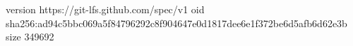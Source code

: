 version https://git-lfs.github.com/spec/v1
oid sha256:ad94c5bbc069a5f84796292c8f904647e0d1817dee6e1f372be6d5afb6d62e3b
size 349692
